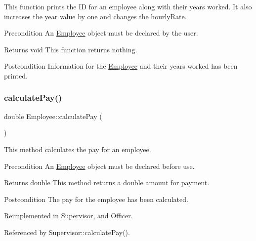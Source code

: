 This function prints the ID for an employee along with their years worked. It also increases the year value by one and changes the hourly\+Rate.

\begin{DoxyPrecond}{Precondition}
An \hyperlink{classEmployee}{Employee} object must be declared by the user. 
\end{DoxyPrecond}
\begin{DoxyReturn}{Returns}
void This function returns nothing. 
\end{DoxyReturn}
\begin{DoxyPostcond}{Postcondition}
Information for the \hyperlink{classEmployee}{Employee} and their years worked has been printed. 
\end{DoxyPostcond}
\mbox{\label{classEmployee_a01c2c44e15434237db28832f6972e960}} 
\subsubsection{\texorpdfstring{calculate\+Pay()}{calculatePay()}}
{\footnotesize\ttfamily double Employee\+::calculate\+Pay (\begin{DoxyParamCaption}{ }\end{DoxyParamCaption})\hspace{0.3cm}{\ttfamily [virtual]}}

This method calculates the pay for an employee.

\begin{DoxyPrecond}{Precondition}
An \hyperlink{classEmployee}{Employee} object must be declared before use. 
\end{DoxyPrecond}
\begin{DoxyReturn}{Returns}
double This method returns a double amount for payment. 
\end{DoxyReturn}
\begin{DoxyPostcond}{Postcondition}
The pay for the employee has been calculated. 
\end{DoxyPostcond}


Reimplemented in \hyperlink{classSupervisor_aa37daa89523c08b84ae8141299e036f8}{Supervisor}, and \hyperlink{classOfficer_a1fa1aad39b9e95be7a088990ebf17059}{Officer}.



Referenced by Supervisor\+::calculate\+Pay().

